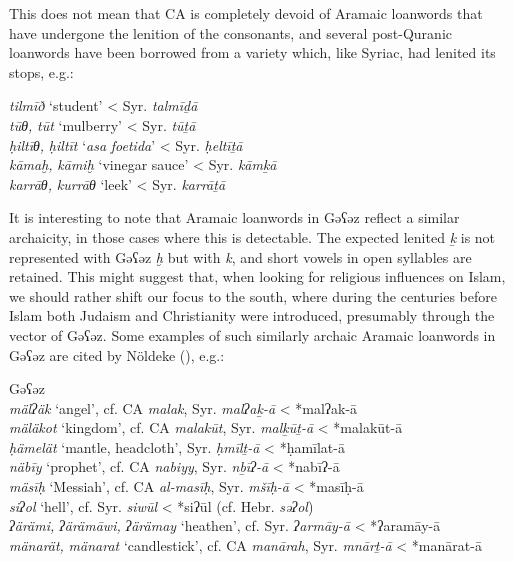\documentclass[output=paper]{langsci/langscibook}
\begin{document}
This does not mean that CA is completely devoid of Aramaic loanwords that have undergone the lenition of the consonants, and several post-Quranic loanwords have been borrowed from a variety which, like Syriac, had lenited its stops, e.g.:

\ea
\ea\textit{tilmīð} ‘student’ < Syr. \textit{talmīḏā}  \citep[254]{Fraenkel1886}\\
\ex\textit{tūθ,} \textit{tūt} ‘mulberry’ < Syr. \textit{tūṯā}  \citep[140]{Fraenkel1886}\\
\ex\textit{ḥiltīθ,} \textit{ḥiltīt} ‘\textit{asa} \textit{foetida}’ < Syr. \textit{ḥeltīṯā} \citep[140]{Fraenkel1886}\\
\ex\textit{kāmaḫ,} \textit{kāmiḫ} ‘vinegar sauce’ < Syr. \textit{kāmḵā} \citep[288]{Fraenkel1886}\\
\ex\textit{karrāθ,} \textit{kurrāθ} ‘leek’ < Syr. \textit{karrāṯā} \citep[144]{Fraenkel1886}
\z
\z

It is interesting to note that Aramaic loanwords in Gəʕəz reflect a similar archaicity, in those cases where this is detectable. The expected lenited \textit{ḵ} is not represented with Gəʕəz \textit{ḫ} but with \textit{k}, and short vowels in open syllables are retained. This might suggest that, when looking for religious influences on Islam, we should rather shift our focus to the south, where during the centuries before Islam both Judaism and Christianity were introduced, presumably through the vector of Gəʕəz. Some examples of such similarly archaic Aramaic loanwords in Gəʕəz are cited by Nöldeke (\citeyear[31--46]{Nöldeke1910}), e.g.:

\ea Gəʕəz\\
\ea \textit{mälʔäk} ‘angel’, cf. CA \textit{malak}, Syr. \textit{malʔaḵ-ā} < *malʔak-ā\\
\ex \textit{mäläkot} ‘kingdom’, cf. CA \textit{malakūt}, Syr. \textit{malḵūṯ-ā} < *malakūt-ā\\
\ex \textit{ḥämelät} ‘mantle, headcloth’, Syr. \textit{ḥmīlṯ-ā} < *ḥamīlat-ā\\
\ex \textit{näbīy} ‘prophet’, cf. CA \textit{nabiyy}, Syr. \textit{nḇīʔ{}-ā} < *nabīʔ-ā\\
\ex \textit{mäsīḥ} ‘Messiah’, cf. CA \textit{al-masīḥ}, Syr. \textit{mšīḥ-ā} < *masīḥ-ā\\
\ex \textit{siʔol} ‘hell’, cf. Syr. \textit{siwūl} < *siʔūl (cf. Hebr. \textit{səʔol})\\
\ex \textit{ʔärämi,} \textit{ʔärämāwi,} \textit{ʔärämay} ‘heathen’, cf. Syr. \textit{ʔarmāy-ā} < *ʔaramāy-ā\\
\ex \textit{mänarät,} \textit{mänarat} ‘candlestick’, cf. CA \textit{manārah}, Syr. \textit{mnārṯ-ā} < *manārat-ā
\z
\z
\end{document}
